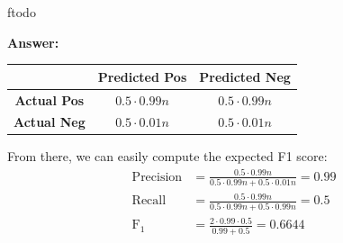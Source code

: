 ƒtodo\documentclass{article}
\newenvironment{QandA}{\begin{enumerate}[label=\arabic*.]}{\end{enumerate}}
\newenvironment{InnerQandA}{\begin{enumerate}[label=\roman*.]}{\end{enumerate}}
\newenvironment{answer}{\par\normalfont \textbf{Answer:}}{}
\begin{document}
\begin{QandA}
\begin{InnerQandA}
\begin{answer}
            \begin{table}[h!]
            \centering
            \begin{tabular}{|c|c|c|}
            \hline
                                  & \textbf{Predicted Pos} & \textbf{Predicted Neg} \\ \hline
            \textbf{Actual Pos}  & $0.5 \cdot 0.99n$                      & $0.5 \cdot 0.99n$                       \\ \hline
            \textbf{Actual Neg} & $0.5 \cdot 0.01n$                       & $0.5 \cdot 0.01n$                       \\ \hline
            \end{tabular}
            \end{table}
             From there, we can easily compute the expected F1 score:
             \begin{align*}
                 \text{Precision} &= \frac{0.5 \cdot 0.99n}{0.5 \cdot 0.99n + 0.5 \cdot 0.01n} = 0.99\\
                \text{Recall} &= \frac{0.5 \cdot 0.99n}{0.5 \cdot 0.99n + 0.5 \cdot 0.99n} = 0.5\\
                \text{F}_1 &=  \frac{2 \cdot 0.99 \cdot 0.5}{0.99 + 0.5} = 0.6644
             \end{align*}
         \end{answer}
    \end{InnerQandA}


\end{QandA}
\end{document}
